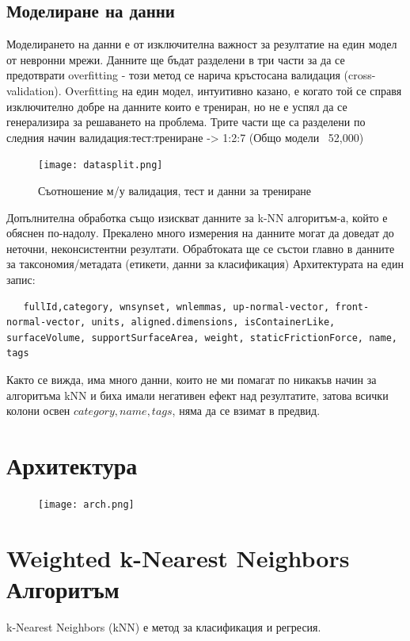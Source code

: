 \subsection{Моделиране на данни}

Моделирането на данни е от изключителна важност за резултатие на един модел от невронни мрежи. Данните ще бъдат разделени в три части за да се предотврати overfitting - този метод се нарича кръстосана валидация (cross-validation). Overfitting на един модел, интуитивно казано, е когато той се справя изключително добре на данните които е трениран, но не е успял да се генерализира за решаването на проблема. Трите части ще са разделени по следния начин валидация:тест:трениране -> 1:2:7 (Общо модели ~52,000)

\begin{center}
\begin{figure}[h]
    \centering
    \texttt{[image: datasplit.png]}
    \caption{Съотношение м/у валидация, тест и данни за трениране}
\end{figure}
\end{center}

Допълнителна обработка също изискват данните за k-NN алгоритъм-а, който е обяснен по-надолу. Прекалено много измерения на данните могат да доведат до неточни, неконсистентни резултати.
Обрабтоката ще се състои главно в данните за таксономия/метадата (етикети, данни за класификация)  Архитектурата на един запис:

\begin{lstlisting}
   fullId,category, wnsynset, wnlemmas, up-normal-vector, front-normal-vector, units, aligned.dimensions, isContainerLike, surfaceVolume, supportSurfaceArea, weight, staticFrictionForce, name, tags
\end{lstlisting}

Както се вижда, има много данни, които не ми помагат по никакъв начин за алгоритъма kNN и биха имали негативен ефект над резултатите, затова всички колони освен $category, name, tags$, няма да се взимат в предвид.
\section{Архитектура}
\begin{center}
\begin{figure}[h]
    \centering
    \texttt{[image: arch.png]}
\end{figure}
\end{center}
\section{Weighted k-Nearest Neighbors Алгоритъм}
k-Nearest Neighbors (kNN) е метод за класификация и регресия.

